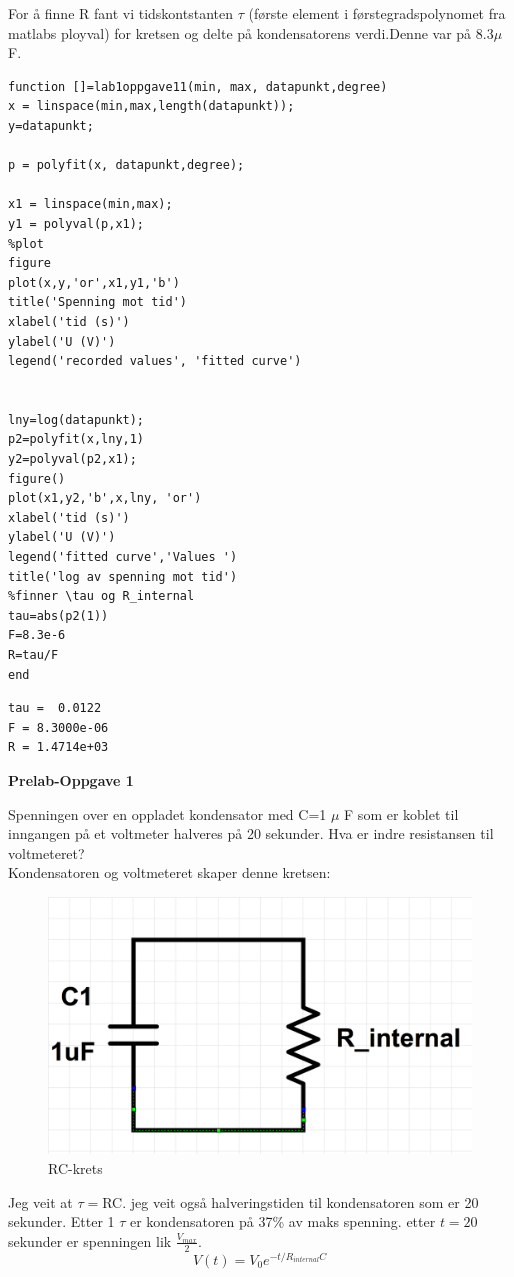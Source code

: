 \documentclass[12pt,a4paper,leqno]{report}
\begin{document}
For å finne R fant vi tidskontstanten $\tau$ (første element i førstegradspolynomet fra matlabs ployval) for kretsen og delte på kondensatorens verdi.Denne var på 8.3$\mu$ F.

\begin{verbatim}
function []=lab1oppgave11(min, max, datapunkt,degree)
x = linspace(min,max,length(datapunkt));
y=datapunkt;

p = polyfit(x, datapunkt,degree);

x1 = linspace(min,max);
y1 = polyval(p,x1);
%plot
figure
plot(x,y,'or',x1,y1,'b')
title('Spenning mot tid')
xlabel('tid (s)')
ylabel('U (V)')
legend('recorded values', 'fitted curve')


lny=log(datapunkt);
p2=polyfit(x,lny,1)
y2=polyval(p2,x1);
figure()
plot(x1,y2,'b',x,lny, 'or')
xlabel('tid (s)')
ylabel('U (V)')
legend('fitted curve','Values ')
title('log av spenning mot tid')
%finner \tau og R_internal
tau=abs(p2(1))
F=8.3e-6
R=tau/F
end
\end{verbatim}

\begin{verbatim}
tau =  0.0122
F = 8.3000e-06
R = 1.4714e+03
\end{verbatim}



\textbf{Prelab-Oppgave 1}

Spenningen over en oppladet kondensator med C=1 $\mu$ F
som er koblet til inngangen på et voltmeter halveres på 20 sekunder. Hva er indre resistansen til voltmeteret?\\
Kondensatoren og voltmeteret skaper denne kretsen:
\begin{figure}[H]
\caption{RC-krets}
\centering
\includegraphics[width=\textwidth]{RC-cirquit.jpg}
\end{figure}
Jeg veit at $\tau=$RC. jeg veit også halveringstiden til kondensatoren som er 20 sekunder. Etter  1 $\tau$  er kondensatoren på 37\% av maks spenning. etter $t=20$ sekunder er spenningen lik $\frac{V_{max}}{2}$.
\begin{equation}
V(t)=V_0e^{-t/R_{internal}C}
\end{equation}
\end{document}
